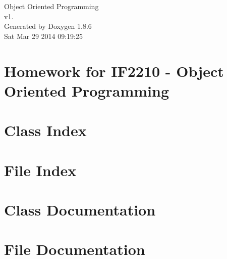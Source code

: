 \documentclass[twoside]{book}
\newcommand{\clearemptydoublepage}{%
  \newpage{\pagestyle{empty}\cleardoublepage}%
}
\begin{document}
\hypersetup{pageanchor=false}
\begin{titlepage}
\vspace*{7cm}
\begin{center}%
{\Large Object Oriented Programming \\[1ex]\large v1. }\\
\vspace*{1cm}
{\large Generated by Doxygen 1.8.6}\\
\vspace*{0.5cm}
{\small Sat Mar 29 2014 09:19:25}\\
\end{center}
\end{titlepage}
\clearemptydoublepage
\tableofcontents
\clearemptydoublepage
{}
\hypersetup{pageanchor=true}

\chapter{Homework for I\-F2210 -\/ Object Oriented Programming}
\label{index}\hypertarget{index}{}
\chapter{Class Index}

\chapter{File Index}

\chapter{Class Documentation}






\chapter{File Documentation}





















\newpage
{}
{}
\printindex
\end{document}
